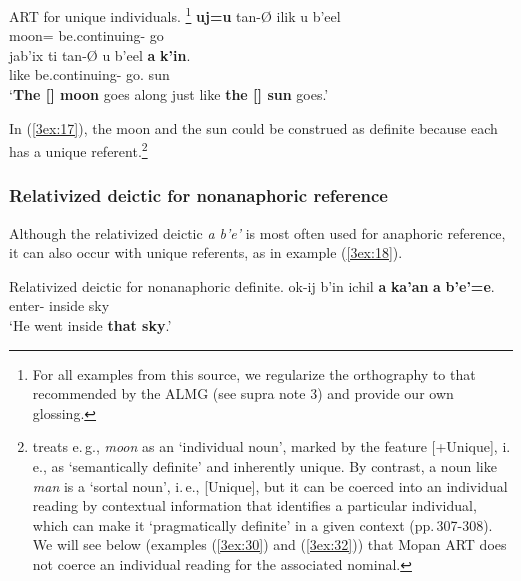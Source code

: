 \documentclass[output=paper]{langsci/langscibook}
\begin{document}
\begin{exe}
\ex\label{3ex:17}
ART for unique individuals. \footnote{For all examples from this source, we regularize the orthography to that recommended by the ALMG (see supra note 3) and provide our own glossing.} 
\exi{}
	{\bf{uj=u}}			tan-{\O}				ilik 		u   		b'eel  \\
	{}	moon={}		be.continuing-{}	{}	{}	go{} \\
\glt
\exi{}
\gll	jab'ix	ti 			tan-{\O}					u		b'eel 		{\bf{a}}	{\bf{k'in}}. 	 \\
	like	{}		be.continuing-{}		{}	go.{}	{}	sun \\
\glt	`{\bf{The [{}] moon}} goes along just like {\bf{the [{}] sun}} goes.'
\end{exe}

In (\ref{3ex:17}), the moon and the sun could be construed as definite because each has a unique referent.\footnote{\cite[][282]{lobner:11} treats e.\,g., {\emph{moon}} as an `individual noun', marked by the feature [+Unique], i.\,e., as `semantically definite' and inherently unique.  By contrast, a noun like {\emph{man}} is a `sortal noun', i.\,e., [\minus Unique], but it can be coerced into an individual reading by contextual information that identifies a particular individual, which can make it `pragmatically definite' in a given context (pp.\,307-308). We will see below (examples (\ref{3ex:30}) and (\ref{3ex:32})) that Mopan ART does not coerce an individual reading for the associated nominal. }


\subsubsection{Relativized deictic for nonanaphoric reference}\label{3sec:322}

Although the relativized deictic {\emph{a b'e'}} is most often used for anaphoric reference, it can also occur with unique referents, as in example (\ref{3ex:18}).

\filbreak
\begin{exe}
\ex\label{3ex:18}
Relativized deictic for nonanaphoric definite. 
\exi{}
\gll	ok-ij 						b'in 			ichil 		{\bf{a}} 	{\bf{ka'an}} 	{\bf{a}} 	{\bf{b'e'=e}}. \\
	enter-{}		{}		inside	{\sc{art}}	sky			{}	{} \\
\glt 	`He went inside {\bf{that sky}}.'
\end{exe}
\end{document}
